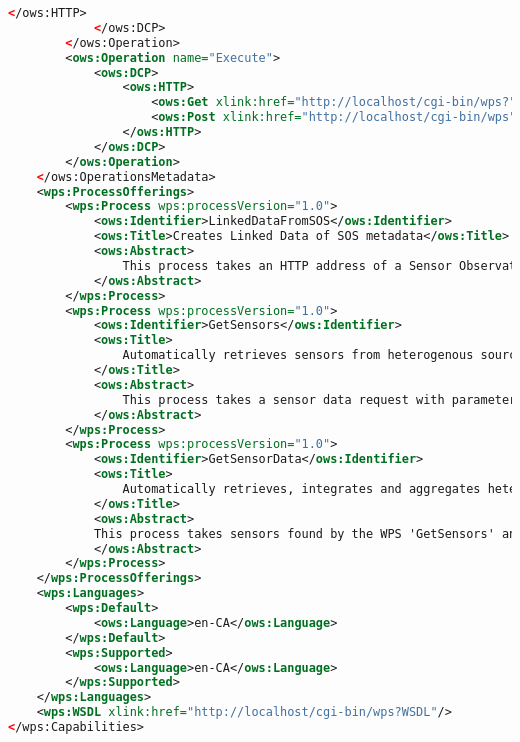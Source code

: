 \begin{lstlisting}[language=xml]
				</ows:HTTP>
			</ows:DCP>
		</ows:Operation>
		<ows:Operation name="Execute">
			<ows:DCP>
				<ows:HTTP>
					<ows:Get xlink:href="http://localhost/cgi-bin/wps?"/>
					<ows:Post xlink:href="http://localhost/cgi-bin/wps"/>
				</ows:HTTP>
			</ows:DCP>
		</ows:Operation>
	</ows:OperationsMetadata>
	<wps:ProcessOfferings>
		<wps:Process wps:processVersion="1.0">
			<ows:Identifier>LinkedDataFromSOS</ows:Identifier>
			<ows:Title>Creates Linked Data of SOS metadata</ows:Title>
			<ows:Abstract>
				This process takes an HTTP address of a Sensor Observation Service (SOS) as input and converts the metadata to linked data.
			</ows:Abstract>
		</wps:Process>
		<wps:Process wps:processVersion="1.0">
			<ows:Identifier>GetSensors</ows:Identifier>
			<ows:Title>
				Automatically retrieves sensors from heterogenous sources using the semantic web
			</ows:Title>
			<ows:Abstract>
				This process takes a sensor data request with parameters for spatial features of interest, observed property, temporal range and granularity, and finds all relevant sensor data sources on the semantic web.
			</ows:Abstract>
		</wps:Process>
		<wps:Process wps:processVersion="1.0">
			<ows:Identifier>GetSensorData</ows:Identifier>
			<ows:Title>
				Automatically retrieves, integrates and aggregates heterogenous sensor data using the semantic web
			</ows:Title>
			<ows:Abstract>
			This process takes sensors found by the WPS 'GetSensors' and automatically integrates and aggregates the data from different sources on the web.
			</ows:Abstract>
		</wps:Process>
	</wps:ProcessOfferings>
	<wps:Languages>
		<wps:Default>
			<ows:Language>en-CA</ows:Language>
		</wps:Default>
		<wps:Supported>
			<ows:Language>en-CA</ows:Language>
		</wps:Supported>
	</wps:Languages>
	<wps:WSDL xlink:href="http://localhost/cgi-bin/wps?WSDL"/>
</wps:Capabilities>
\end{lstlisting}

\clearpage

